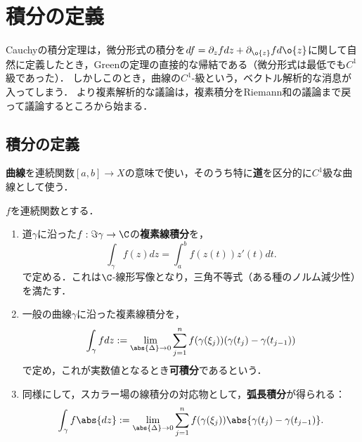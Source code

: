 \documentclass[uplatex, dvipdfmx]{jsreport}
\begin{document}
\section{積分の定義}

\begin{tcolorbox}[colframe=ForestGreen, colback=ForestGreen!10!white,breakable,colbacktitle=ForestGreen!40!white,coltitle=black,fonttitle=\bfseries\sffamily,
title=]
    Cauchyの積分定理は，微分形式の積分を$df=\partial_zfdz+\partial_{\o{z}}fd\o{z}$に関して自然に定義したとき，Greenの定理の直接的な帰結である（微分形式は最低でも$C^1$級であった）．
    しかしこのとき，曲線の$C^1$-級という，ベクトル解析的な消息が入ってしまう．
    より複素解析的な議論は，複素積分をRiemann和の議論まで戻って議論するところから始まる．
\end{tcolorbox}

\subsection{積分の定義}

\begin{notation}
    \textbf{曲線}を連続関数$[a,b]\to X$の意味で使い，そのうち特に\textbf{道}を区分的に$C^1$級な曲線として使う．
\end{notation}

\begin{discussion}
    $f$を連続関数とする．
    \begin{enumerate}
        \item 道$\gamma$に沿った$f:\Im\gamma\to\C$の\textbf{複素線積分}を，
        \[\int_\gamma f(z)dz=\int^b_af(z(t))z'(t)dt.\]
        で定める．これは$\C$-線形写像となり，三角不等式（ある種のノルム減少性）を満たす．
        \item 一般の曲線$\gamma$に沿った複素線積分を，
        \[\int_\gamma fdz:=\lim_{\abs{\Delta}\to0}\sum^n_{j=1}f(\gamma(\xi_j))(\gamma(t_j)-\gamma(t_{j-1}))\]
        で定め，これが実数値となるとき\textbf{可積分}であるという．
        \item 同様にして，スカラー場の線積分の対応物として，\textbf{弧長積分}が得られる：
        \[\int_\gamma f\abs{dz}:=\lim_{\abs{\Delta}\to0}\sum^n_{j=1}f(\gamma(\xi_j))\abs{\gamma(t_j)-\gamma(t_{j-1})}.\]
    \end{enumerate}
\end{discussion}
\end{document}
